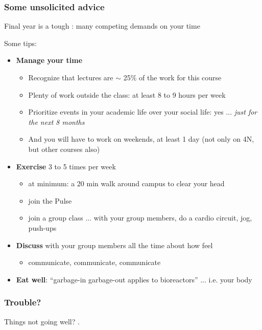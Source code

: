 \begin{frame}\frametitle{Some unsolicited advice}
	\begin{exampleblock}{}
		Final year is a tough : many competing demands on your time
	\end{exampleblock}	
	\vspace{6pt}
	Some tips:
	\begin{itemize}		
		\item	\textbf{Manage your time}
		\begin{itemize}
			\item	Recognize that lectures are $\sim$ 25\% of the work for this course
			\item	Plenty of work outside the class: at least 8 to 9 hours per week
			\item	Prioritize events in your academic life over your social life: yes ... \emph{just for the next 8 months}
			\item	And you will have to work on weekends, at least 1 day (not only on 4N, but other courses also)
		\end{itemize}
		\pause
		\item	\textbf{Exercise} 3 to 5 times per week
		\begin{itemize}
			\item	at minimum: a 20 min walk around campus to clear your head
			\item	join the Pulse
			\item	join a group class ... with your group members, do a cardio circuit, jog, push-ups
		\end{itemize}		
		\pause
		\item	\textbf{Discuss} with your group members all the time about how feel 
		\begin{itemize}
			\item	communicate, communicate, communicate
		\end{itemize}
		\item	\textbf{Eat well}: ``garbage-in garbage-out applies to bioreactors'' ... i.e. your body
	\end{itemize}	
\end{frame}

\begin{frame}\frametitle{Trouble?}
	\begin{exampleblock}{}
		\vspace{12pt}
		Things not going well? {}.
		\vspace{12pt}
	\end{exampleblock}
\end{frame}

